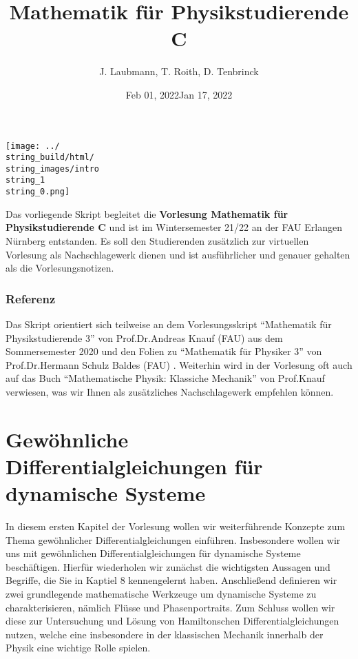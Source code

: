 \documentclass[letterpaper,10pt,english]{jupyterBook}
\title{Mathematik für Physikstudierende C}
\date{Feb 01, 2022}
\date{Jan 17, 2022}
\author{J.\@{} Laubmann, T.\@{} Roith, D.\@{} Tenbrinck}
\begin{document}
\label{\detokenize{intro::doc}}


\noindent\texttt{[image: ../\\string\_build/html/\\string\_images/intro\\string\_1\\string\_0.png]}

\par
Das vorliegende Skript begleitet die \textbf{Vorlesung Mathematik für Physikstudierende C} und ist im Wintersemester 21/22 an der FAU Erlangen Nürnberg entstanden. Es soll den Studierenden zusätzlich zur virtuellen Vorlesung als Nachschlagewerk dienen und ist ausführlicher und genauer gehalten als die Vorlesungsnotizen.

\subsection{Referenz}

\par
Das Skript orientiert sich teilweise an dem Vorlesungsskript “Mathematik für Physikstudierende 3” \cite{Kna20} von Prof.Dr.Andreas Knauf (FAU) aus dem Sommersemester 2020 und den Folien zu “Mathematik für Physiker 3” von Prof.Dr.Hermann Schulz Baldes (FAU) \cite{SB18}. Weiterhin wird in der Vorlesung oft auch auf das Buch “Mathematische Physik: Klassiche Mechanik” \cite{Kna17} von Prof.Knauf verwiesen, was wir Ihnen als zusätzliches Nachschlagewerk empfehlen können.


\chapter{Gewöhnliche Differentialgleichungen für dynamische Systeme}
\label{\detokenize{ode/ode:gewohnliche-differentialgleichungen-fur-dynamische-systeme}}\label{\detokenize{ode/ode::doc}}
\par
In diesem ersten Kapitel der Vorlesung wollen wir weiterführende Konzepte zum Thema gewöhnlicher Differentialgleichungen einführen.
Insbesondere wollen wir uns mit gewöhnlichen Differentialgleichungen für dynamische Systeme beschäftigen.
Hierfür wiederholen wir zunächst die wichtigsten Aussagen und Begriffe, die Sie in Kaptiel 8 \cite{Ten21} kennengelernt haben.
Anschließend definieren wir zwei grundlegende mathematische Werkzeuge um dynamische Systeme zu charakterisieren, nämlich Flüsse und Phasenportraits.
Zum Schluss wollen wir diese zur Untersuchung und Lösung von Hamiltonschen Differentialgleichungen nutzen, welche eine insbesondere in der klassischen Mechanik innerhalb der Physik eine wichtige Rolle spielen.
\end{document}
